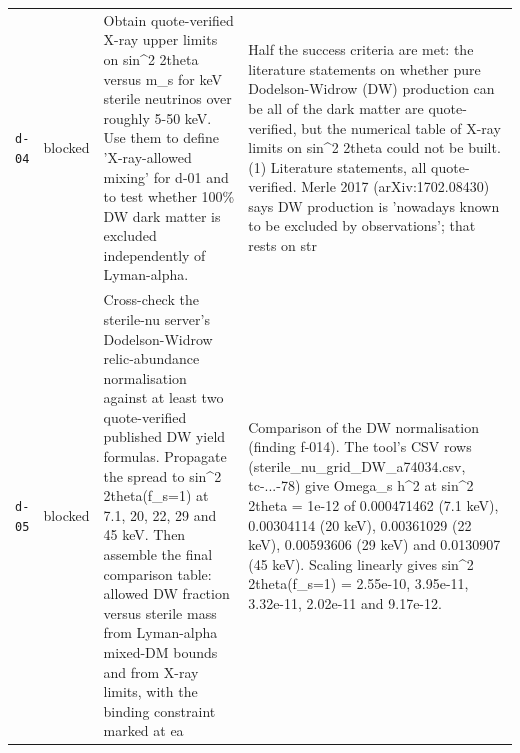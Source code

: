 \documentclass[11pt,a4paper]{article}
\begin{document}
\begin{longtable}{@{}p{}p{}p{}p{}@{}}
\texttt{d-04} & blocked & Obtain quote-verified X-ray upper limits on sin\textasciicircum{}2 2theta versus m\_s for keV sterile neutrinos over roughly 5-50 keV. Use them to define 'X-ray-allowed mixing' for d-01 and to test whether 100\% DW dark matter is excluded independently of Lyman-alpha. & Half the success criteria are met: the literature statements on whether pure Dodelson-Widrow (DW) production can be all of the dark matter are quote-verified, but the numerical table of X-ray limits on sin\textasciicircum{}2 2theta could not be built. (1) Literature statements, all quote-verified. Merle 2017 (arXiv:1702.08430) says DW production is 'nowadays known to be excluded by observations'; that rests on str \\
\texttt{d-05} & blocked & Cross-check the sterile-nu server's Dodelson-Widrow relic-abundance normalisation against at least two quote-verified published DW yield formulas. Propagate the spread to sin\textasciicircum{}2 2theta(f\_s=1) at 7.1, 20, 22, 29 and 45 keV. Then assemble the final comparison table: allowed DW fraction versus sterile mass from Lyman-alpha mixed-DM bounds and from X-ray limits, with the binding constraint marked at ea & Comparison of the DW normalisation (finding f-014). The tool's CSV rows (sterile\_nu\_grid\_DW\_a74034.csv, tc-...-78) give Omega\_s h\textasciicircum{}2 at sin\textasciicircum{}2 2theta = 1e-12 of 0.000471462 (7.1 keV), 0.00304114 (20 keV), 0.00361029 (22 keV), 0.00593606 (29 keV) and 0.0130907 (45 keV). Scaling linearly gives sin\textasciicircum{}2 2theta(f\_s=1) = 2.55e-10, 3.95e-11, 3.32e-11, 2.02e-11 and 9.17e-12.


\end{longtable}
\end{document}
